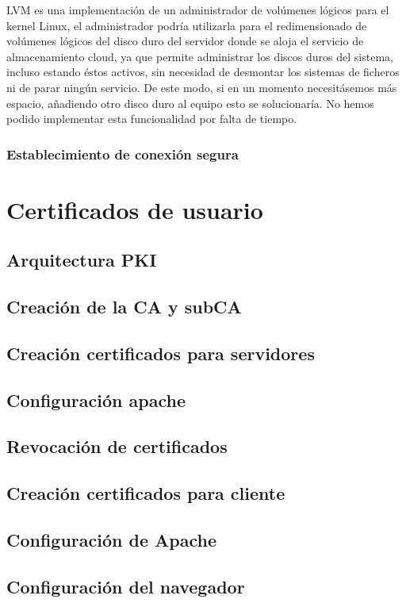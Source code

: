 \documentclass[a4paper]{article}
\begin{document}
LVM es una implementación de un administrador de volúmenes lógicos para el kernel Linux, el administrador podría utilizarla para el redimensionado de volúmenes lógicos del disco duro del servidor donde se aloja el servicio de almacenamiento cloud, ya que permite administrar los discos duros del sistema, incluso estando éstos activos, sin necesidad de desmontar los sistemas de ficheros ni de parar ningún servicio. De este modo, si en un momento necesitásemos más espacio, añadiendo otro disco duro
al equipo esto se solucionaría. No
hemos podido implementar esta funcionalidad por falta de tiempo.


\subsubsection{Establecimiento de conexión segura}

\section{Certificados de usuario}
\subsection{Arquitectura PKI}
\subsection{Creación de la CA y subCA}
\subsection{Creación certificados para servidores}
\subsection{Configuración apache}
\subsection{Revocación de certificados}
\subsection{Creación certificados para cliente}
\subsection{Configuración de Apache}
\subsection{Configuración del navegador}
\end{document}
